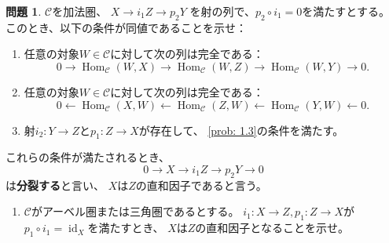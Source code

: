 \documentclass[uplatex,dvipdfmx]{jsarticle}
\theoremstyle{definition}
\newtheorem{prob}[prob]{問題}
\DeclareMathOperator{\Hom}{\mathrm{Hom}}
\DeclareMathOperator{\id}{\mathrm{id}}
\newcommand\mcC{\mathcal{C}}
\begin{document}
\begin{prob}\label{1.4}
  \(\mcC\)を加法圏、
  \(X\rightarrow{i_1} Z \rightarrow{p_2} Y\)
  を射の列で、\(p_2\circ i_1 = 0\)を満たすとする。
  このとき、以下の条件が同値であることを示せ：
  \begin{enumerate}
    \item \label{1.4.1}
    任意の対象\(W\in \mcC\)に対して次の列は完全である：
    \[
    0 \to \Hom_{\mcC}(W,X) \to \Hom_{\mcC}(W,Z) \to \Hom_{\mcC}(W,Y) \to 0.
    \]
    \item \label{1.4.2}
    任意の対象\(W\in \mcC\)に対して次の列は完全である：
    \[
    0 \gets \Hom_{\mcC}(X,W) \gets \Hom_{\mcC}(Z,W) \gets \Hom_{\mcC}(Y,W) \gets 0.
    \]
    \item \label{1.4.3}
    射\(i_2:Y\to Z\)と\(p_1:Z\to X\)が存在して、
    \autoref{prob: 1.3}の条件を満たす。
  \end{enumerate}
  これらの条件が満たされるとき、
  \[ 0\to X\rightarrow{i_1} Z \rightarrow{p_2} Y \to 0 \]
  は\textbf{分裂する}と言い、
  \(X\)は\(Z\)の直和因子であると言う。
  \begin{enumerate}[label=(\fnsymbol*),start=2]
    \item \label{1.4.4}
    \(\mcC\)がアーベル圏または三角圏であるとする。
    \(i_1:X\to Z, p_1:Z\to X\)が
    \(p_1\circ i_1 = \id_X\)を満たすとき、
    \(X\)は\(Z\)の直和因子となることを示せ。
  \end{enumerate}
\end{prob}
\end{document}
